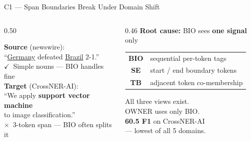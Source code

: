 \documentclass[aspectratio=169]{beamer}
\newcommand{\highlight}[1]{\textcolor{accent}{\textbf{#1}}}
\begin{document}
\begin{frame}{C1 --- Span Boundaries Break Under Domain Shift}

  \begin{columns}[T]
    \begin{column}{0.50\textwidth}
      \begin{codebox}
        \textcolor{good}{\textbf{Source} (newswire):}\\[3pt]
        ``\underline{Germany} defeated \underline{Brazil} 2-1.''\\
        \textcolor{good}{\small $\checkmark$\ Simple nouns — BIO handles fine}\\[10pt]
        \textcolor{bad}{\textbf{Target} (CrossNER-AI):}\\[3pt]
        ``We apply \textbf{support vector machine}\\
        \phantom{``We apply }to image classification.''\\
        \textcolor{bad}{\small $\times$\ 3-token span — BIO often splits it}
      \end{codebox}
    \end{column}
    \begin{column}{0.46\textwidth}
      \textbf{Root cause:} BIO sees \highlight{one signal} only\\[6pt]
      \begin{tabular}{cl}
        \textbf{BIO} & sequential per-token tags \\[4pt]
        \textbf{SE}  & start / end boundary tokens \\[4pt]
        \textbf{TB}  & adjacent token co-membership \\
      \end{tabular}
      \vspace{10pt}
      \begin{keybox}
        All three views exist.\\
        OWNER uses only BIO.\\[4pt]
        \highlight{60.5 F1} on CrossNER-AI\\
        — lowest of all 5 domains.
      \end{keybox}
    \end{column}
  \end{columns}
\end{frame}
\end{document}
